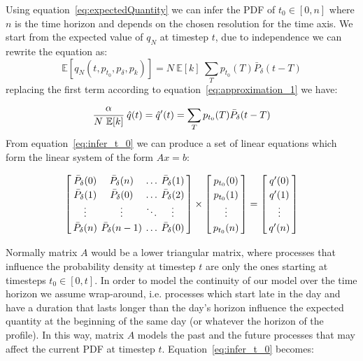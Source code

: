 \documentclass[conference]{IEEEtran}
\begin{document}
Using equation~\eqref{eq:expectedQuantity} we can infer the PDF of $t_0 \in [0, n]$ where $n$ is the time horizon and depends on the chosen resolution for the time axis. We start from the expected value of $q_N$ at timestep $t$, due to independence we can rewrite the equation as:
\begin{equation}
\mathbb{E}\left[ q_N(t, p_{t_0}, p_{\delta}, p_k) \right] = N~\mathbb{E}[k]~\sum_{T} p_{t_0}(T) \bar{P}_{\delta} (t-T)
\end{equation}
replacing the first term according to equation~\eqref{eq:approximation_1} we have:
\begin{equation}
\cfrac{\alpha}{N~\mathbb{E}[k]}~\hat{q}(t) = \hat{q}'(t) = \sum_{T} p_{t_0}(T) \bar{P}_{\delta} (t-T) \label{eq:infer_t_0}
\end{equation}
From equation~\eqref{eq:infer_t_0} we can produce a set of linear equations which form the linear system of the form $Ax = b$:
\begin{small}
\begin{equation}\label{eq:linearSystem}
\arraycolsep=2pt\def\arraystretch{1.2}
\left[\begin{array}{cccc}  
 \bar{P}_{\delta}(0)  & \bar{P}_{\delta}(n) & \ldots  & \bar{P}_{\delta}(1)\\
 \bar{P}_{\delta}(1)  & \bar{P}_{\delta}(0) & \ldots  & \bar{P}_{\delta}(2)\\
\vdots  & \vdots & \ddots  & \vdots\\
 \bar{P}_{\delta}(n)  & \bar{P}_{\delta}(n-1) & \ldots  & \bar{P}_{\delta}(0)
\end{array}\right]
\times
\left[\begin{array}{c}  
 p_{t_0}(0) \\ 
  p_{t_0}(1) \\
 \vdots \\
 p_{t_0}(n) \\  
\end{array}\right]
=
\left[\begin{array}{c}  
 q'(0) \\ 
  q'(1) \\ 
 \vdots \\
 q'(n) \\  
\end{array}\right]
\end{equation}
\end{small}Normally matrix $A$ would be a lower triangular matrix, where processes that influence the probability density at timestep $t$ are only the ones starting at timesteps $t_0 \in [0, t]$. In order to model the continuity of our model over the time horizon we assume wrap-around, i.e. processes which start late in the day and have a duration that lasts longer than the day's horizon influence the expected quantity at the beginning of the same day (or whatever the horizon of the profile). In this way, matrix $A$ models the past and the future processes that may affect the current PDF at timestep $t$. Equation~\eqref{eq:infer_t_0} becomes:
\end{document}
